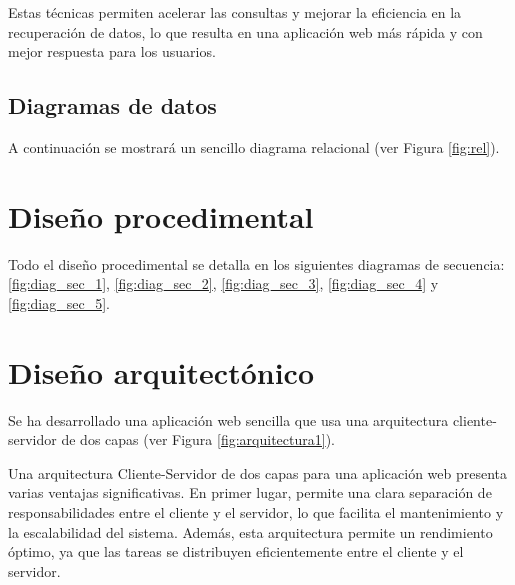 Estas técnicas permiten acelerar las consultas y mejorar la eficiencia en la recuperación de datos, lo que resulta en una aplicación web más rápida y con mejor respuesta para los usuarios.

\subsection{Diagramas de datos}
A continuación se mostrará un sencillo diagrama relacional (ver Figura \ref{fig:rel}).



\section{Diseño procedimental}
Todo el diseño procedimental se detalla en los siguientes diagramas de secuencia: \ref{fig:diag_sec_1}, \ref{fig:diag_sec_2}, \ref{fig:diag_sec_3}, \ref{fig:diag_sec_4} y \ref{fig:diag_sec_5}. 





\section{Diseño arquitectónico}

Se ha desarrollado una aplicación web sencilla que usa una arquitectura cliente-servidor de dos capas (ver Figura \ref{fig:arquitectura1}).


Una arquitectura Cliente-Servidor de dos capas para una aplicación web presenta varias ventajas significativas. En primer lugar, permite una clara separación de responsabilidades entre el cliente y el servidor, lo que facilita el mantenimiento y la escalabilidad del sistema. Además, esta arquitectura permite un rendimiento óptimo, ya que las tareas se distribuyen eficientemente entre el cliente y el servidor. 

